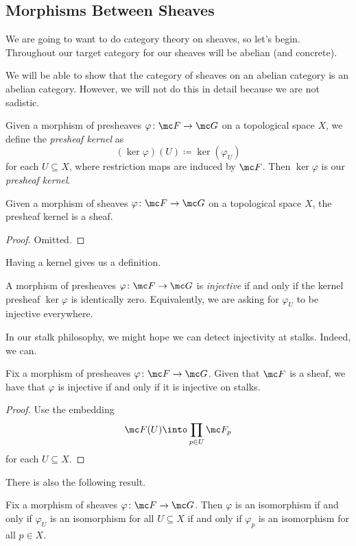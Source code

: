 \documentclass[../notes.tex]{subfiles}
\begin{document}
\subsection{Morphisms Between Sheaves}
We are going to want to do category theory on sheaves, so let's begin. Throughout our target category for our sheaves will be abelian (and concrete).
\begin{remark}
	We will be able to show that the category of sheaves on an abelian category is an abelian category. However, we will not do this in detail because we are not sadistic.
\end{remark}
\begin{definition}
	Given a morphism of presheaves $\varphi\colon\mc F\to\mc G$ on a topological space $X$, we define the \textit{presheaf kernel} as
	\[(\ker\varphi)(U)\coloneqq\ker(\varphi_U)\]
	for each $U\subseteq X$, where restriction maps are induced by $\mc F$. Then $\ker\varphi$ is our \textit{presheaf kernel}.
\end{definition}
\begin{lemma}
	Given a morphism of sheaves $\varphi\colon\mc F\to\mc G$ on a topological space $X$, the presheaf kernel is a sheaf.
\end{lemma}
\begin{proof}
	Omitted.
\end{proof}
Having a kernel gives us a definition.
\begin{definition}[Injective]
	A morphism of presheaves $\varphi\colon\mc F\to\mc G$ is \textit{injective} if and only if the kernel presheaf $\ker\varphi$ is identically zero. Equivalently, we are asking for $\varphi_U$ to be injective everywhere.
\end{definition}
In our stalk philosophy, we might hope we can detect injectivity at stalks. Indeed, we can.
\begin{proposition} \label{prop:injonstalks}
	Fix a morphism of presheaves $\varphi\colon\mc F\to\mc G$. Given that $\mc F$ is a sheaf, we have that $\varphi$ is injective if and only if it is injective on stalks.
\end{proposition}
\begin{proof}
	Use the embedding
	\[\mc F(U)\into\prod_{p\in U}\mc F_p\]
	for each $U\subseteq X$.
\end{proof}
There is also the following result.
\begin{proposition}
	Fix a morphism of sheaves $\varphi\colon\mc F\to\mc G$. Then $\varphi$ is an isomorphism if and only if $\varphi_U$ is an isomorphism for all $U\subseteq X$ if and only if $\varphi_p$ is an isomorphism for all $p\in X$.
\end{proposition}
\end{document}
